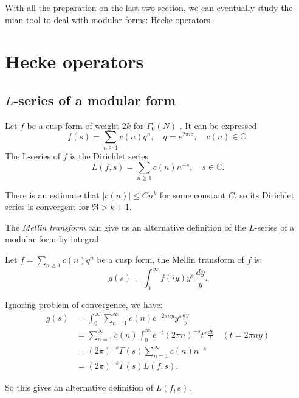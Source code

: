     With all the preparation on the last two section, we can eventually study the mian tool to deal with modular forms: Hecke operators.

    \section{Hecke operators} 

    \subsection{$L$-series of a modular form}
 
    Let $ f$  be a cusp form of weight  $2k$  for  $\Gamma_{0}(N)$ . It can be expressed
    $$f(s)=\sum_{n \geq 1} c(n) q^{n}, \quad q=e^{2 \pi i z}, \quad c(n) \in \mathbb{C} .$$
    The  L-series of $ f$  is the Dirichlet series
    $$L(f, s)=\sum_{n \geq 1} c(n) n^{-s}, \quad s \in \mathbb{C} .$$

    There is an estimate that $\vert c(n)\vert \leq Cn^k$ for some constant $C$, so its Dirichlet series is convergent for $\mathfrak{R} > k+1$.

    The \textit{Mellin transform} can give us  an alternative definition of the $L$-series of a modular form by integral. 

    \begin{definition}
        Let $f=\sum_{n \geq 1}c(n)q^n$ be a cusp form, the Mellin transform of $f$ is:
        $$g(s)=\int_{0}^{\infty} f(iy)y^s \,\frac{dy}{y}.$$
    \end{definition}

    \begin{remark}
        Ignoring problem of convergence, we have:
        $$
        \begin{aligned}
            g(s) & =\int_{0}^{\infty} \sum_{n=1}^{\infty} c(n) e^{-2 \pi n y} y^{s} \frac{d y}{y} \\
            & =\sum_{n=1}^{\infty} c(n) \int_{0}^{\infty} e^{-t}(2 \pi n)^{-s} t^{s} \frac{d t}{t} \quad(t=2 \pi n y) \\
            & =(2 \pi)^{-s} \Gamma(s) \sum_{n=1}^{\infty} c(n) n^{-s} \\
            & =(2 \pi)^{-s} \Gamma(s) L(f, s) .
        \end{aligned}
        $$

        So this  gives an alternative definition of $L(f, s)$.
    \end{remark}

